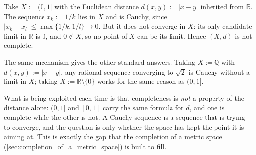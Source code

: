 \begin{exercisesolution}
\label{sol:incomplete_metric_space_example}
Take $X := (0,1]$ with the Euclidean distance $d(x,y) := \lvert x-y\rvert$ inherited from
$\mathbb{R}$. The sequence $x_k := 1/k$ lies in $X$ and is Cauchy, since $\lvert x_k - x_l\rvert \le
\max\{1/k, 1/l\} \to 0$. But it does not converge in $X$: its only candidate limit in $\mathbb{R}$
is $0$, and $0 \notin X$, so no point of $X$ can be its limit. Hence $(X,d)$ is not complete.

The same mechanism gives the other standard answers. Taking $X := \mathbb{Q}$ with
$d(x,y) := \lvert x-y\rvert$, any rational sequence converging to $\sqrt2$ is Cauchy without a limit
in $X$; taking $X := \mathbb{R} \setminus \{0\}$ works for the same reason as $(0,1]$.
\begin{ainote}
What is being exploited each time is that completeness is \emph{not} a property of the distance
alone: $(0,1]$ and $[0,1]$ carry the same formula for $d$, and one is complete while the other is
not. A Cauchy sequence is a sequence that is trying to converge, and the question is only whether
the space has kept the point it is aiming at. This is exactly the gap that the completion of a
metric space (\cref{sec:completion_of_a_metric_space}) is built to fill.
\end{ainote}
\end{exercisesolution}

